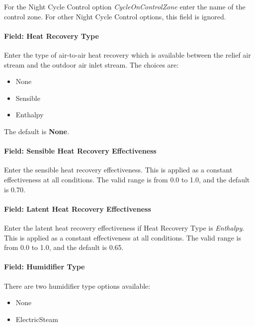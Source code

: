For the Night Cycle Control option \emph{CycleOnControlZone} enter the name of the control zone. For other Night Cycle Control options, this field is ignored.

\paragraph{Field: Heat Recovery Type}\label{field-heat-recovery-type-2}

Enter the type of air-to-air heat recovery which is available between the relief air stream and the outdoor air inlet stream. The choices are:

\begin{itemize}
\item
  None
\item
  Sensible
\item
  Enthalpy
\end{itemize}

The default is \textbf{None}\emph{.}

\paragraph{Field: Sensible Heat Recovery Effectiveness}\label{field-sensible-heat-recovery-effectiveness-2}

Enter the sensible heat recovery effectiveness. This is applied as a constant effectiveness at all conditions. The valid range is from 0.0 to 1.0, and the default is 0.70.

\paragraph{Field: Latent Heat Recovery Effectiveness}\label{field-latent-heat-recovery-effectiveness-2}

Enter the latent heat recovery effectiveness if Heat Recovery Type is \emph{Enthalpy}. This is applied as a constant effectiveness at all conditions. The valid range is from 0.0 to 1.0, and the default is 0.65.

\paragraph{Field: Humidifier Type}\label{field-humidifier-type-1}

There are two humidifier type options available:

\begin{itemize}
\item
  None
\item
  ElectricSteam
\end{itemize}

